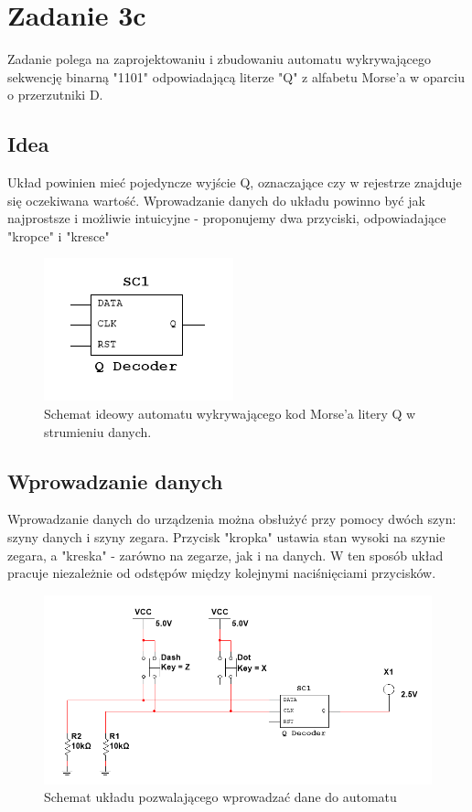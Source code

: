 \documentclass[12pt,a4paper,table]{article}
\begin{document}
    \pagebreak
    \section{Zadanie 3c}
    Zadanie polega na zaprojektowaniu i zbudowaniu automatu wykrywającego sekwencję binarną "1101" odpowiadającą
    literze "Q" z alfabetu Morse'a w oparciu o przerzutniki D.

    \subsection{Idea}
    Układ powinien mieć pojedyncze wyjście Q, oznaczające czy w rejestrze znajduje się oczekiwana wartość.
    Wprowadzanie danych do układu powinno być jak najprostsze i możliwie intuicyjne - proponujemy dwa 
    przyciski, odpowiadające "kropce" i "kresce"

    \begin{figure}[h]
        \centering
        \includegraphics[width=0.3\linewidth]{images/q_idea.PNG}
        \caption{Schemat ideowy automatu wykrywającego kod Morse'a litery Q
        w strumieniu danych.}
        \label{fig:q_idea}
    \end{figure}

    \subsection{Wprowadzanie danych}
    Wprowadzanie danych do urządzenia można obsłużyć przy pomocy dwóch
    szyn: szyny danych i szyny zegara. Przycisk "kropka" ustawia stan wysoki
    na szynie zegara, a "kreska" - zarówno na zegarze, jak i na danych.
    W ten sposób układ pracuje niezależnie od odstępów między kolejnymi naciśnięciami
    przycisków.

    \begin{figure}[h]
        \centering
        \includegraphics[width=\linewidth]{images/q_input.PNG}
        \caption{Schemat układu pozwalającego wprowadzać dane do automatu}
        \label{fig:q_input}
    \end{figure}
\end{document}
